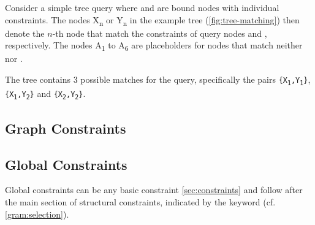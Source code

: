 \documentclass[11pt,a4paper]{report}
\begin{document}
Consider a simple tree query \query{[\$x:~[\$y:]]} where  and  are bound nodes with individual constraints.
The nodes X\textsubscript{n} or Y\textsubscript{n} in the example tree (\cref{fig:tree-matching}) then denote the $n$-th node that match the constraints of query nodes  and , respectively.
The nodes A\textsubscript{1} to A\textsubscript{6} are placeholders for nodes that match neither  nor .

The tree contains 3 possible matches for the query, specifically the pairs \texttt{\{X\textsubscript{1},Y\textsubscript{1}\}}, \texttt{\{X\textsubscript{1},Y\textsubscript{2}\}} and \texttt{\{X\textsubscript{2},Y\textsubscript{2}\}}.

\noindent{}

\subsection{Graph Constraints}
\label{sec:graph-constraints}


\subsection{Global Constraints}
\label{sec:global-constraints}

Global constraints can be any basic constraint \cref{sec:constraints} and follow after the main section of structural constraints, indicated by the  keyword (cf. \cref{gram:selection}).
\end{document}
